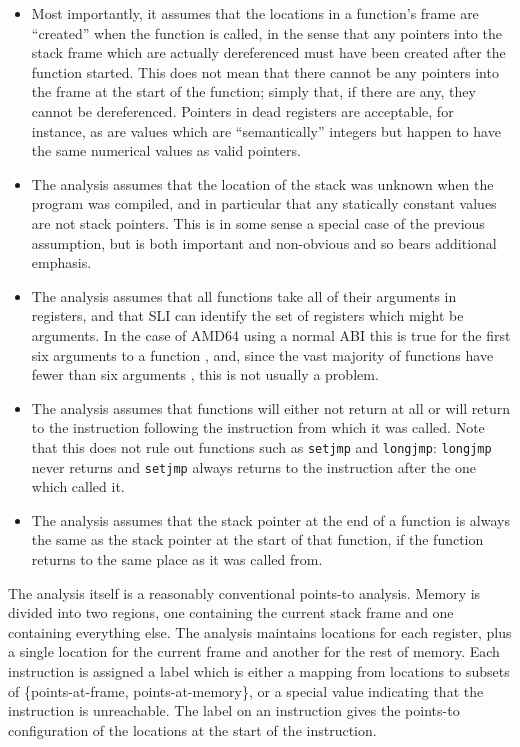 \begin{itemize}
\item
  Most importantly, it assumes that the locations in a function's
  frame are ``created'' when the function is called, in the sense that
  any pointers into the stack frame which are actually dereferenced
  must have been created after the function started.  This does not
  mean that there cannot be any pointers into the frame at the start
  of the function; simply that, if there are any, they cannot be
  dereferenced.  Pointers in dead registers are acceptable, for
  instance, as are values which are ``semantically'' integers but
  happen to have the same numerical values as valid pointers.

\item
  The analysis assumes that the location of the stack was unknown when
  the program was compiled, and in particular that any statically
  constant values are not stack pointers.  This is in some sense a
  special case of the previous assumption, but is both important and
  non-obvious and so bears additional emphasis.

\item
  The analysis assumes that all functions take all of their arguments
  in registers, and that SLI can identify the set of registers which
  might be arguments.  In the case of AMD64 using a normal ABI this is
  true for the first six arguments to a function \needCite{}, and,
  since the vast majority of functions have fewer than six arguments
  \needCite{}, this is not usually a problem.  

\item
  The analysis assumes that functions will either not return at all or
  will return to the instruction following the instruction from which
  it was called.  Note that this does not rule out functions such as
  \verb|setjmp| and \verb|longjmp|: \verb|longjmp|
  never returns and \verb|setjmp| always returns to the instruction
  after the one which called it.

\item
  The analysis assumes that the stack pointer at the end of a function
  is always the same as the stack pointer at the start of that
  function, if the function returns to the same place as it was called
  from.
\end{itemize}

The analysis itself is a reasonably conventional points-to analysis.
Memory is divided into two regions, one containing the current stack
frame and one containing everything else.  The analysis maintains
locations for each register, plus a single location for the current
frame and another for the rest of memory.  Each instruction is
assigned a label which is either a mapping from locations to subsets
of \{points-at-frame, points-at-memory\}, or a special value
indicating that the instruction is unreachable.  The label on an
instruction gives the points-to configuration of the locations at the
start of the instruction.

